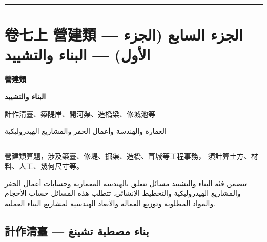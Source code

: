 \documentclass[11pt,a4paper]{article}
\newcommand{\ar}[1]{\arabicfont\beginR #1\endR}
\newcommand{\longline}{\noindent\rule{\textwidth}{0.4pt}}
\newcounter{probnum}
\begin{document}
\vspace{0.5cm}
\longline
\newpage

\setcounter{probnum}{0}

\section{卷七上 \quad 營建類 — \ar{الجزء السابع (الجزء الأول) — البناء والتشييد}}
\label{sec:fasc7a}

\begin{center}
{\Large\bfseries\color{volcolor} 營建類}

\vspace{0.2cm}

{\fontsize{14}{18}\selectfont\arabicfont\beginR\color{volcolor}\textbf{البناء والتشييد}\endR}

\vspace{0.2cm}

{\small\color{notecolor} 計作清臺、築隄岸、開河渠、造橋梁、修城池等}

{\small\color{notecolor}\arabicfont\beginR العمارة والهندسة وأعمال الحفر والمشاريع الهيدروليكية\endR}
\end{center}

\vspace{0.3cm}
\longline
\vspace{0.3cm}

\noindent
\begin{minipage}[t]{0.48\textwidth}
營建類算題，涉及築臺、修堤、掘渠、造橋、葺城等工程事務，
須計算土方、材料、人工、幾何尺寸等。
\end{minipage}
\hfill
\begin{minipage}[t]{0.48\textwidth}
\arabicfont\beginR
تتضمن فئة البناء والتشييد مسائل تتعلق بالهندسة المعمارية وحسابات
أعمال الحفر والمشاريع الهيدروليكية والتخطيط الإنشائي. تتطلب هذه
المسائل حساب الأحجام والمواد المطلوبة وتوزيع العمالة والأبعاد
الهندسية لمشاريع البناء العملية.
\endR
\end{minipage}

\vspace{0.5cm}

\subsection{計作清臺 — \ar{بناء مصطبة تشينغ}}
\end{document}
